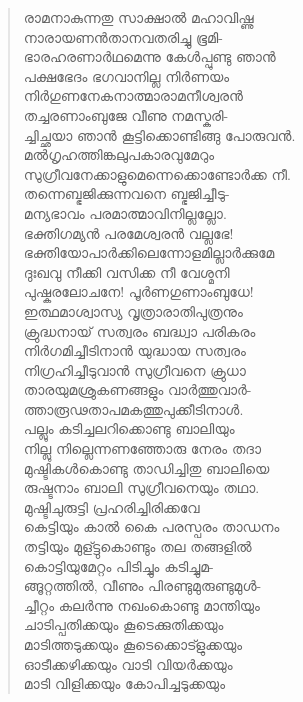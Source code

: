 \begin{verse}
രാമനാകുന്നതു സാക്ഷാല്‍ മഹാവിഷ്ണു\\
നാരായണന്‍താനവതരിച്ചു ഭൂമി-\\
ഭാരഹരണാര്‍ഥമെന്നു കേള്‍പ്പുണ്ടു ഞാന്‍\\
പക്ഷഭേദം ഭഗവാനില്ല നിര്‍ണയം\\
നിര്‍ഗുണനേകനാത്മാരാമനീശ്വരന്‍\\
തച്ചരണാംബുജേ വീണു നമസ്കരി-\\
ച്ചിച്ഛയാ ഞാന്‍ കൂട്ടിക്കൊണ്ടിങ്ങു പോരുവന്‍.\\
മല്‍ഗൃഹത്തിങ്കലുപകാരവുമേറും\\
സുഗ്രീവനേക്കാളുമെന്നെക്കൊണ്ടോര്‍ക്ക നീ.\\
തന്നെബ്ഭജിക്കുന്നവനെ ബ്ഭജിച്ചീടു-\\
മന്യഭാവം പരമാത്മാവിനില്ലല്ലോ.\\
ഭക്തിഗമ്യന്‍ പരമേശ്വരന്‍ വല്ലഭേ!\\
ഭക്തിയോപാര്‍ക്കിലെന്നോളമില്ലാര്‍ക്കുമേ\\
ദുഃഖവു നീക്കി വസിക്ക നീ വേശ്മനി\\
പുഷ്കരലോചനേ! പൂര്‍ണഗുണാംബുധേ!\\
ഇത്ഥമാശ്വാസ്യ വൃത്രാരാതിപുത്രനും\\
ക്രുദ്ധനായ് സത്വരം ബദ്ധ്വാ പരികരം\\
നിര്‍ഗമിച്ചീടിനാന്‍ യുദ്ധായ സത്വരം\\
നിഗ്രഹിച്ചീടുവാന്‍ സുഗ്രീവനെ ക്രുധാ\\
താരയുമശ്രുകണങ്ങളും വാര്‍ത്തുവാര്‍-\\
ത്താരൂഢതാപമകത്തുപുക്കീടിനാള്‍.\\
പല്ലും കടിച്ചലറിക്കൊണ്ടു ബാലിയും\\
നില്ലു നില്ലെന്നണഞ്ഞോരു നേരം തദാ\\
മുഷ്ടികള്‍കൊണ്ടു താഡിച്ചിതു ബാലിയെ\\
രുഷ്ടനാം ബാലി സുഗ്രീവനെയും തഥാ.\\
മുഷ്ടിചുരുട്ടി പ്രഹരിച്ചിരിക്കവേ\\
കെട്ടിയും കാല്‍ കൈ പരസ്പരം താഡനം\\
തട്ടിയും മുള്ട്ടുകൊണ്ടും തല തങ്ങളില്‍\\
കൊട്ടിയുമേറ്റം പിടിച്ചും കടിച്ചുമ-\\
ങ്ങൂറ്റത്തില്‍, വീണും പിരണ്ടുമുരുണ്ടുമുള്‍-\\
ച്ചീറ്റം കലര്‍ന്നു നഖംകൊണ്ടു മാന്തിയും\\
ചാടിപ്പതിക്കയും കൂടെക്കുതിക്കയും\\
മാടിത്തടുക്കയും കൂടെക്കൊട്ളുക്കയും\\
ഓടീക്കഴിക്കയും വാടി വിയര്‍ക്കയും\\
മാടി വിളിക്കയും കോപിച്ചടുക്കയും\\

\end{verse}

